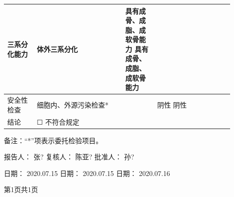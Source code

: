 \documentclass[UTF8,10pt,a4paper,fontset=fandol]{ctexart}
\newcommand{\fieldvalue}[1]{#1}
\newcommand{\handwritten}[1]{#1}
\newcommand{\checkboxfield}[1]{\ifstrequal{#1}{checked}{☑}{\ifstrequal{#1}{unclear}{?}{☐}}}
\begin{document}
\begin{tabular}{|p{0.12\linewidth}|p{0.36\linewidth}|p{0.13\linewidth}|p{0.31\linewidth}|}
\fieldvalue{三系分化能力} &
\fieldvalue{体外三系分化} &
\fieldvalue{具有成骨、成脂、成软骨能力}
\quad
\fieldvalue{具有成骨、成脂、成软骨能力}
\\
\hline
\fieldvalue{安全性检查} &
\fieldvalue{细胞内、外源污染检查*} &
&
\fieldvalue{阴性}
\quad
\fieldvalue{阴性}
\\
\hline
结论 &
\multicolumn{3}{l|}{%
\fieldvalue{\checkboxfield{unchecked}} 不符合规定}
\\
\hline
\end{tabular}

\normalsize

\medskip

\noindent
备注：“*”项表示委托检验项目。

\vfill

\noindent
报告人：
\fieldvalue{\handwritten{张?}}
\hfill
复核人：
\fieldvalue{\handwritten{陈亚?}}
\hfill
批准人：
\fieldvalue{\handwritten{孙?}}

\medskip

\noindent
日\quad 期：
\fieldvalue{\handwritten{2020.07.15}}
\hfill
日\quad 期：
\fieldvalue{\handwritten{2020.07.15}}
\hfill
日\quad 期：
\fieldvalue{\handwritten{2020.07.16}}

\medskip

\begin{center}
第1页共1页
\end{center}


\newpage
\end{document}
